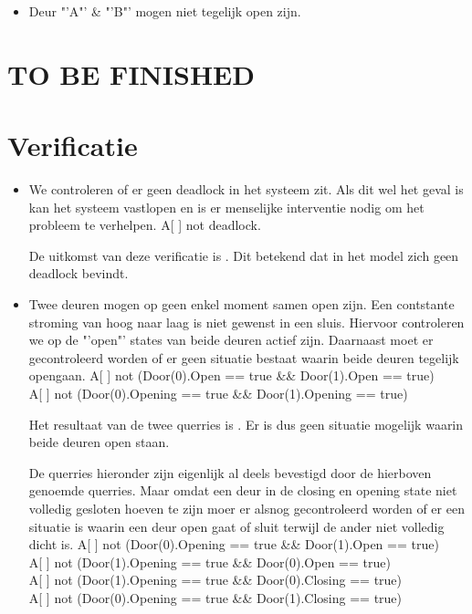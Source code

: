 \documentclass{article}
\begin{document}
\begin{itemize}
\item Deur "'A"' \& "'B"' mogen niet tegelijk open zijn.
\end{itemize}

\vskip2cm

\section{\Large\color{red} \textbf{TO BE FINISHED}}

\clearpage %
\section{Verificatie}
\begin{itemize}
\item We controleren of er geen deadlock in het systeem zit. Als dit wel het geval is kan het systeem vastlopen en is er menselijke interventie nodig om het probleem te verhelpen.
{\center A[ ] not deadlock.\\}
\vskip0.3cm

De uitkomst van deze verificatie is {\color{green}{groen}}. Dit betekend dat in het model zich geen deadlock bevindt.
\vskip0.5cm

\item Twee deuren mogen op geen enkel moment samen open zijn. Een contstante stroming van hoog naar laag is niet gewenst in een sluis. Hiervoor controleren we op de "'open"' states van beide deuren actief zijn. Daarnaast moet er gecontroleerd worden of er geen situatie bestaat waarin beide deuren tegelijk opengaan.
{\center 
A[ ] not (Door(0).Open == true \&\& Door(1).Open == true)\\
A[ ] not (Door(0).Opening == true \&\& Door(1).Opening == true)\\
}
\vskip0.3cm

Het resultaat van de twee querries is {\color{green}{groen}}. Er is dus geen situatie mogelijk waarin beide deuren open staan.

De querries hieronder zijn eigenlijk al deels bevestigd door de hierboven genoemde querries. Maar omdat een deur in de closing en opening state niet volledig gesloten hoeven te zijn moer er alsnog gecontroleerd worden of er een situatie is waarin een deur open gaat of sluit terwijl de ander niet volledig dicht is.
{\center
A[ ] not (Door(0).Opening == true \&\& Door(1).Open == true)\\
A[ ] not (Door(1).Opening == true \&\& Door(0).Open == true)\\
\vskip0.1cm
A[ ] not (Door(1).Opening == true \&\& Door(0).Closing == true)\\
A[ ] not (Door(0).Opening == true \&\& Door(1).Closing == true)\\
}
\vskip0.3cm


\end{itemize}
\end{document}
